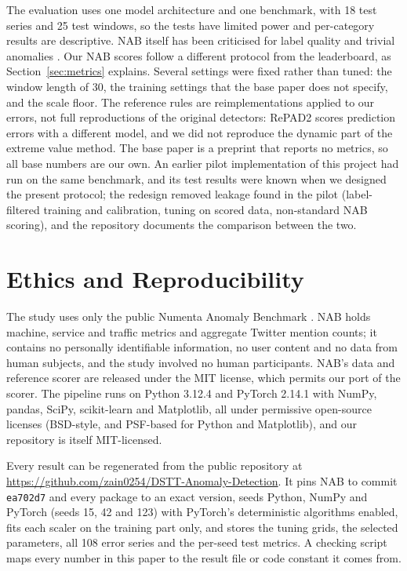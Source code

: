 \documentclass[conference]{IEEEtran}
\begin{document}
The evaluation uses one model architecture and one benchmark, with 18 test series and 25 test windows, so the tests have limited power and per-category results are descriptive. NAB itself has been criticised for label quality and trivial anomalies \cite{wu2023}. Our NAB scores follow a different protocol from the leaderboard, as Section~\ref{sec:metrics} explains. Several settings were fixed rather than tuned: the window length of 30, the training settings that the base paper does not specify, and the scale floor. The reference rules are reimplementations applied to our errors, not full reproductions of the original detectors: RePAD2 scores prediction errors with a different model, and we did not reproduce the dynamic part of the extreme value method. The base paper is a preprint that reports no metrics, so all base numbers are our own. An earlier pilot implementation of this project had run on the same benchmark, and its test results were known when we designed the present protocol; the redesign removed leakage found in the pilot (label-filtered training and calibration, tuning on scored data, non-standard NAB scoring), and the repository documents the comparison between the two.

\section{Ethics and Reproducibility}

The study uses only the public Numenta Anomaly Benchmark \cite{nab2024}. NAB holds machine, service and traffic metrics and aggregate Twitter mention counts; it contains no personally identifiable information, no user content and no data from human subjects, and the study involved no human participants. NAB's data and reference scorer are released under the MIT license, which permits our port of the scorer. The pipeline runs on Python 3.12.4 and PyTorch 2.14.1 with NumPy, pandas, SciPy, scikit-learn and Matplotlib, all under permissive open-source licenses (BSD-style, and PSF-based for Python and Matplotlib), and our repository is itself MIT-licensed.

Every result can be regenerated from the public repository at \url{https://github.com/zain0254/DSTT-Anomaly-Detection}. It pins NAB to commit \texttt{ea702d7} and every package to an exact version, seeds Python, NumPy and PyTorch (seeds 15, 42 and 123) with PyTorch's deterministic algorithms enabled, fits each scaler on the training part only, and stores the tuning grids, the selected parameters, all 108 error series and the per-seed test metrics. A checking script maps every number in this paper to the result file or code constant it comes from.
\end{document}
